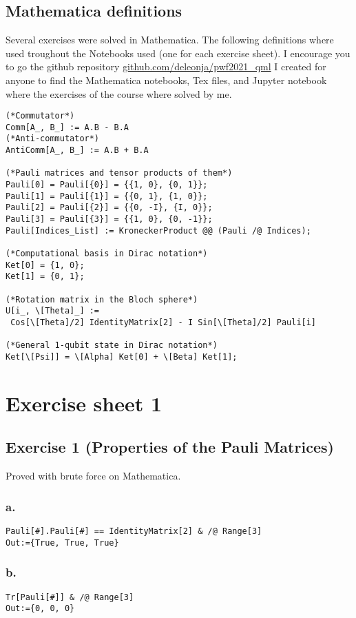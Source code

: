 \subsection*{Mathematica definitions}
Several exercises were solved in Mathematica. The following definitions 
where used troughout the Notebooks used (one for each exercise sheet).
I encourage you to go the github repository \href{https://github.com/deleonja/pwf2021_qml}
{github.com/deleonja/pwf2021\_qml} I created for anyone to find the Mathematica
notebooks, Tex files, and Jupyter notebook where the exercises of the course 
where solved by me.
\begin{verbatim}
(*Commutator*)
Comm[A_, B_] := A.B - B.A
(*Anti-commutator*)
AntiComm[A_, B_] := A.B + B.A

(*Pauli matrices and tensor products of them*)
Pauli[0] = Pauli[{0}] = {{1, 0}, {0, 1}};
Pauli[1] = Pauli[{1}] = {{0, 1}, {1, 0}};
Pauli[2] = Pauli[{2}] = {{0, -I}, {I, 0}};
Pauli[3] = Pauli[{3}] = {{1, 0}, {0, -1}};
Pauli[Indices_List] := KroneckerProduct @@ (Pauli /@ Indices);

(*Computational basis in Dirac notation*)
Ket[0] = {1, 0};
Ket[1] = {0, 1};

(*Rotation matrix in the Bloch sphere*)
U[i_, \[Theta]_] := 
 Cos[\[Theta]/2] IdentityMatrix[2] - I Sin[\[Theta]/2] Pauli[i]

(*General 1-qubit state in Dirac notation*)
Ket[\[Psi]] = \[Alpha] Ket[0] + \[Beta] Ket[1];
\end{verbatim}

\section{Exercise sheet 1}

\subsection{Exercise 1 (Properties of the Pauli Matrices)}\noindent 
Proved with brute force on Mathematica.
\subsubsection{a.}
\begin{verbatim}
Pauli[#].Pauli[#] == IdentityMatrix[2] & /@ Range[3]
Out:={True, True, True}
\end{verbatim}

\subsubsection{b.}
\begin{verbatim}
Tr[Pauli[#]] & /@ Range[3]
Out:={0, 0, 0}
\end{verbatim}

